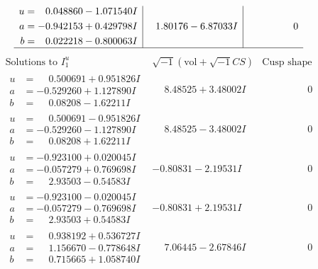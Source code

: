 \documentclass[1p]{elsarticle_modified}
\theoremstyle{definition}
\newcommand{\I}{\sqrt{-1}}
\begin{document}
$$\begin{array}{c|c|c}
\begin{aligned}
u &= \phantom{-}0.048860 - 1.071540 I \\
a &= -0.942153 + 0.429798 I \\
b &= \phantom{-}0.022218 - 0.800063 I\end{aligned}
 & \phantom{-}1.80176 - 6.87033 I & \phantom{-0.000000 } 0\\
 \hline 
 \end{array}$$\newpage$$\begin{array}{c|c|c}  
\text{Solutions to }I^u_{1}& \I (\text{vol} + \sqrt{-1}CS) & \text{Cusp shape}\\
 \hline 
\begin{aligned}
u &= \phantom{-}0.500691 + 0.951826 I \\
a &= -0.529260 + 1.127890 I \\
b &= \phantom{-}0.08208 - 1.62211 I\end{aligned}
 & \phantom{-}8.48525 + 3.48002 I & \phantom{-0.000000 } 0 \\ \hline\begin{aligned}
u &= \phantom{-}0.500691 - 0.951826 I \\
a &= -0.529260 - 1.127890 I \\
b &= \phantom{-}0.08208 + 1.62211 I\end{aligned}
 & \phantom{-}8.48525 - 3.48002 I & \phantom{-0.000000 } 0 \\ \hline\begin{aligned}
u &= -0.923100 + 0.020045 I \\
a &= -0.057279 + 0.769698 I \\
b &= \phantom{-}2.93503 - 0.54583 I\end{aligned}
 & -0.80831 - 2.19531 I & \phantom{-0.000000 } 0 \\ \hline\begin{aligned}
u &= -0.923100 - 0.020045 I \\
a &= -0.057279 - 0.769698 I \\
b &= \phantom{-}2.93503 + 0.54583 I\end{aligned}
 & -0.80831 + 2.19531 I & \phantom{-0.000000 } 0 \\ \hline\begin{aligned}
u &= \phantom{-}0.938192 + 0.536727 I \\
a &= \phantom{-}1.156670 - 0.778648 I \\
b &= \phantom{-}0.715665 + 1.058740 I\end{aligned}
 & \phantom{-}7.06445 - 2.67846 I & \phantom{-0.000000 } 0 \\ \hline\begin{aligned}

\end{aligned}
\end{array}$$
\end{document}
